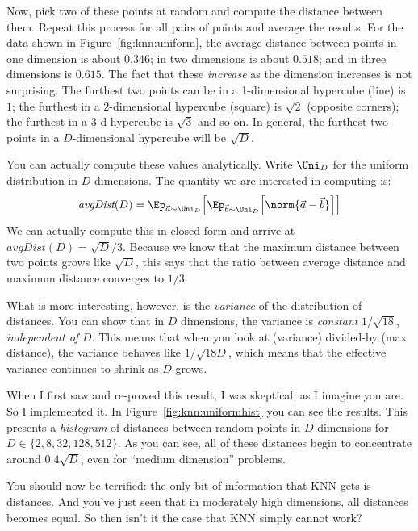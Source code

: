 Now, pick two of these points at random and compute the distance
between them.  Repeat this process for all pairs of points and average
the results.  For the data shown in Figure~\ref{fig:knn:uniform}, the
average distance between points in one dimension is about $0.346$; in two
dimensions is about $0.518$; and in three dimensions is $0.615$. The fact that these \emph{increase} as the dimension increases is not surprising. The furthest two points can be in a 1-dimensional hypercube (line) is $1$; the furthest in a 2-dimensional hypercube (square) is $\sqrt 2$ (opposite corners); the furthest in a 3-d hypercube is $\sqrt 3$ and so on. In general, the furthest two points in a $D$-dimensional hypercube will be $\sqrt D$.

You can actually compute these values analytically.  Write $\Uni_D$ for
the uniform distribution in $D$ dimensions.  The quantity we are
interested in computing is:
\begin{equation} \label{eq:knn:dist}
  \textit{avgDist}(D)
  = \Ep_{\vec a \sim \Uni_D} \Big[
    \Ep_{\vec b \sim \Uni_D} \Big[
      \norm{\vec a - \vec b}
      \Big] \Big]
\end{equation}
We can actually compute this in closed form and arrive
at $\textit{avgDist}(D) = \sqrt D / 3$. Because we know that the maximum distance between two points grows like $\sqrt D$, this says that the ratio between average distance and maximum distance converges to $1/3$.

What is more interesting, however, is the \emph{variance} of the distribution of distances. You can show that in $D$ dimensions, the variance is \emph{constant} $1/\sqrt{18}$, \emph{independent of $D$}. This means that when you look at (variance) divided-by (max distance), the variance behaves like $1/\sqrt{18 D}$, which means that the effective variance continues to shrink as $D$ grows.


When I first saw and re-proved this result, I was skeptical, as I
imagine you are.  So I implemented it.  In
Figure~\ref{fig:knn:uniformhist} you can see the results.  This
presents a \emph{histogram} of distances between random points in $D$
dimensions for $D \in \{2,8,32,128,512\}$.  As you can see, all of
these distances begin to concentrate around $0.4\sqrt{D}$, even for ``medium
dimension'' problems.

You should now be terrified: the only bit of information that KNN gets
is distances.  And you've just seen that in moderately high dimensions,
all distances becomes equal.  So then isn't it the case that KNN
simply cannot work?


